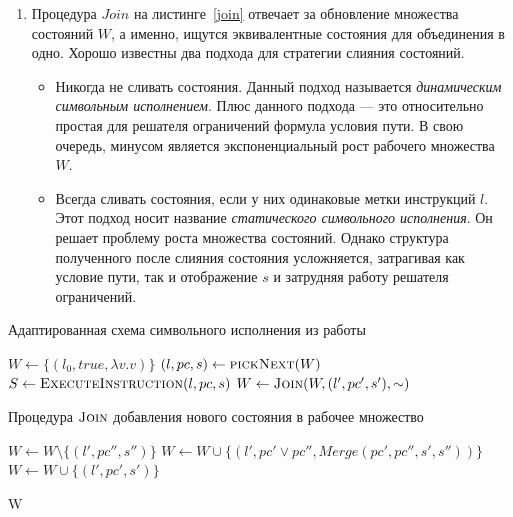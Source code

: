 \begin{enumerate}
    \item Процедура $Join$ на листинге~\ref{join} отвечает за обновление множества состояний $W$, а именно, ищутся эквивалентные состояния для объединения в одно. Хорошо известны два подхода для стратегии слияния состояний. 
    \begin{itemize}
        \item Никогда не сливать состояния. Данный подход называется \emph{динамическим символьным исполнением}. Плюс данного подхода --- это относительно простая для решателя ограничений формула условия пути. В свою очередь, минусом является экспоненциальный рост рабочего множества $W$.
        \item Всегда сливать состояния, если у них одинаковые метки инструкций $l$. Этот подход носит название \emph{статического символьного исполнения}. Он решает проблему роста множества состояний. Однако структура полученного после слияния состояния усложняется, затрагивая как условие пути, так и отображение $s$ и затрудняя работу решателя ограничений.
    \end{itemize}
\end{enumerate}

\begin{algorithm}
    \caption{Адаптированная схема символьного исполнения из работы~\cite{kuznetsov2012efficient}} \label{alg_kuznetsov}
\begin{algorithmic}[1]
        \State $W \gets \{(l_0, true, \lambda v.v)\}$
            \State $(l,pc,s) \gets \textsc{pickNext}(W)$ \label{pickNext}
            \State {}
            \State $S \gets \textsc{ExecuteInstruction}(l, pc, s)$
            \State {}
                \State $W \gets \textsc{Join}(W, (l',pc',s'),\sim)$
            \EndFor
        \EndWhile
        \State {}\;
    \EndProcedure
\end{algorithmic}
\end{algorithm}

\begin{algorithm}
    \caption{Процедура $\textsc{Join}$ добавления нового состояния в рабочее множество} \label{join}
\begin{algorithmic}[1]
            \State $W \gets W \setminus \{(l',pc'',s'')\}$
            \State $W \gets W \cup \{(l',pc' \lor pc'', Merge(pc',pc'',s', s''))\}$
        \Else
            \State $W \gets W \cup \{(l', pc', s')\}$
        \EndIf

        \State \Return W 
    \EndProcedure
\end{algorithmic}
\end{algorithm}


